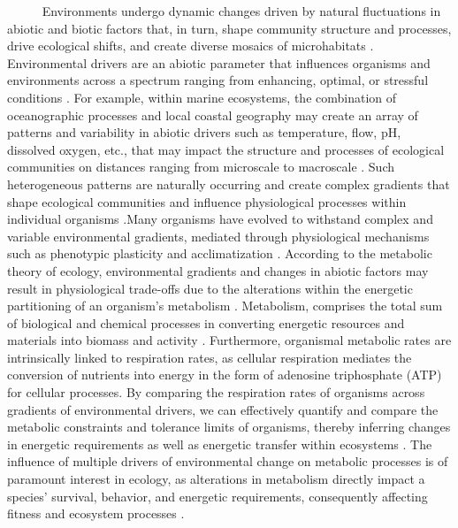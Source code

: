 \documentclass[
]{article}
\begin{document}
~~~~~ Environments undergo dynamic changes driven by natural
fluctuations in abiotic and biotic factors that, in turn, shape
community structure and processes, drive ecological shifts, and create
diverse mosaics of microhabitats
\citep{connell1961influence, stenseth2002ecological, kroeker2017embracing}.
Environmental drivers are an abiotic parameter that influences organisms
and environments across a spectrum ranging from enhancing, optimal, or
stressful conditions
\citep{cote2016interactions, boyd2012understanding}. For example, within
marine ecosystems, the combination of oceanographic processes and local
coastal geography may create an array of patterns and variability in
abiotic drivers such as temperature, flow, pH, dissolved oxygen, etc.,
that may impact the structure and processes of ecological communities on
distances ranging from microscale to macroscale
\citep{deser2010sea, hofmann2010living}. Such heterogeneous patterns are
naturally occurring and create complex gradients that shape ecological
communities and influence physiological processes within individual
organisms \citep{helmuth2006mosaic}.Many organisms have evolved to
withstand complex and variable environmental gradients, mediated through
physiological mechanisms such as phenotypic plasticity and
acclimatization \citep{hofmann2010living, tomanek2002heat}. According to
the metabolic theory of ecology, environmental gradients and changes in
abiotic factors may result in physiological trade-offs due to the
alterations within the energetic partitioning of an organism's
metabolism \citep{portner2008physiology, brown2004metabolic}.
Metabolism, comprises the total sum of biological and chemical processes
in converting energetic resources and materials into biomass and
activity \citep{brown2004metabolic}. Furthermore, organismal metabolic
rates are intrinsically linked to respiration rates, as cellular
respiration mediates the conversion of nutrients into energy in the form
of adenosine triphosphate (ATP) for cellular processes. By comparing the
respiration rates of organisms across gradients of environmental
drivers, we can effectively quantify and compare the metabolic
constraints and tolerance limits of organisms, thereby inferring changes
in energetic requirements as well as energetic transfer within
ecosystems \citep{somero2002thermal, silbiger2019comparative}. The
influence of multiple drivers of environmental change on metabolic
processes is of paramount interest in ecology, as alterations in
metabolism directly impact a species' survival, behavior, and energetic
requirements, consequently affecting fitness and ecosystem processes
\citep{carey2016sea}.
\end{document}
